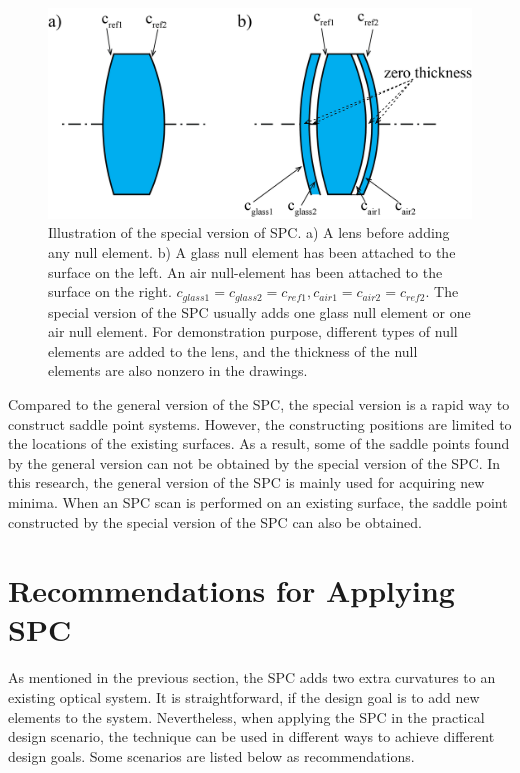 \begin{figure}[h!]
    \centering
    \includegraphics[scale=0.45]{chapter-2/figures/SPCS_illus.png}
    \caption{Illustration of the special version of SPC. a) A lens before adding any null element. b)  A glass null element has been attached to the surface on the left. An air null-element has been attached to the surface on the right. $c_{glass1} = c_{glass2} = c_{ref1}, c_{air1} = c_{air2} = c_{ref2}$. The special version of the SPC usually adds one glass null element or one air null element. For demonstration purpose, different types of null elements are added to the lens, and the thickness of the null elements are also nonzero in the drawings.}
    \label{fig:SPCS-illus}
\end{figure}

Compared to the general version of the SPC, the special version is a rapid way to construct saddle point systems. However, the constructing positions are limited to the locations of the existing surfaces. As a result, some of the saddle points found by the general version can not be obtained by the special version of the SPC. In this research, the general version of the SPC is mainly used for acquiring new minima. When an SPC scan is performed on an existing surface, the saddle point constructed by the special version of the SPC can also be obtained. 


\section{Recommendations for Applying SPC}\label{section: SPC recommendation}
As mentioned in the previous section, the SPC adds two extra curvatures to an existing optical system. It is straightforward, if the design goal is to add new elements to the system. Nevertheless, when applying the SPC in the practical design scenario, the technique can be used in different ways to achieve different design goals. Some scenarios are listed below as recommendations.

